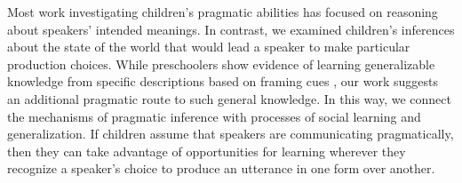 \documentclass[man]{apa2}
\begin{document}
Most work investigating children's pragmatic abilities has focused on reasoning about speakers' intended meanings. In contrast, we examined children's inferences about the state of the world that would lead a speaker to make particular production choices. While preschoolers show evidence of learning generalizable knowledge from specific descriptions based on framing cues \cite{cimpian2009}, our work suggests an additional pragmatic route to such general knowledge. In this way, we connect the mechanisms of pragmatic inference with processes of social learning and generalization. If children assume that speakers are communicating pragmatically, then they can take advantage of opportunities for learning wherever they recognize a speaker's choice to produce an utterance in one form over another. 



\end{document}
